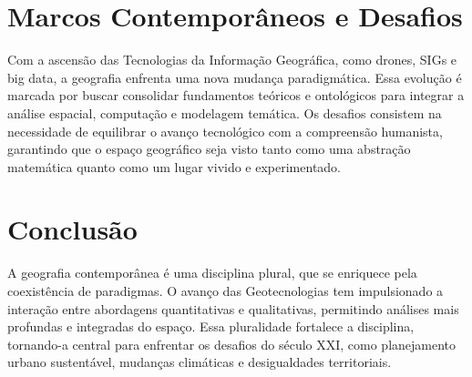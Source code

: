 \documentclass[
]{article}
\begin{document}
\section{Marcos Contemporâneos e Desafios}

Com a ascensão das Tecnologias da Informação Geográfica, como drones, SIGs e big data, a geografia enfrenta uma nova mudança paradigmática. Essa evolução é marcada por buscar consolidar fundamentos teóricos e ontológicos para integrar a análise espacial, computação e modelagem temática. Os desafios consistem na necessidade de equilibrar o avanço tecnológico com a compreensão humanista, garantindo que o espaço geográfico seja visto tanto como uma abstração matemática quanto como um lugar vivido e experimentado.


\section{Conclusão}

A geografia contemporânea é uma disciplina plural, que se enriquece pela coexistência de paradigmas. O avanço das Geotecnologias tem impulsionado a interação entre abordagens quantitativas e qualitativas, permitindo análises mais profundas e integradas do espaço. Essa pluralidade fortalece a disciplina, tornando-a central para enfrentar os desafios do século XXI, como planejamento urbano sustentável, mudanças climáticas e desigualdades territoriais.
\end{document}
